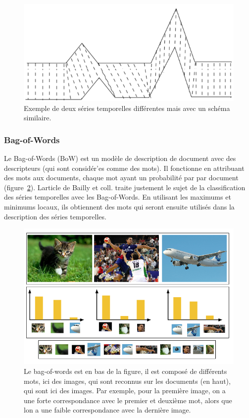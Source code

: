 \documentclass[11pt]{sdm}
\begin{document}
			\begin{figure}[!ht]
				\centering
				\includegraphics[scale=0.6,natwidth=582,natheight=269]{figures/dtw.png}
				\caption{Exemple de deux s\'eries temporelles diff\'erentes mais avec un sch\'ema similaire.}
				\label{fig:dtw}
			\end{figure}

		\subsubsection{Bag-of-Words}	
			Le Bag-of-Words (BoW) est un mod\`ele de description de document avec des descripteurs (qui sont consid\'er'es comme des mots). Il fonctionne en attribuant des mots aux documents, chaque mot ayant un probabilit\'e par par document (figure~\ref{fig:BoW}). L\textquotesingle article de Bailly et coll. \cite{bailly2015bag} traite justement le sujet de la classification des s\'eries temporelles avec les Bag-of-Words. En utilisant les maximums et minimums locaux, ils obtiennent des mots qui seront ensuite utilis\'es dans la description des s\'eries temporelles.

			\begin{figure}[!ht]
				\centering
				\includegraphics[scale=0.6,natwidth=680,natheight=440]{figures/bagOfWords.png}
				\caption{Le bag-of-words est en bas de la figure, il est compos\'e de diff\'erents mots, ici des images, qui sont reconnus sur les documents (en haut), qui sont ici des images. Par exemple, pour la premi\`ere image, on a une forte correspondance avec le premier et deuxi\`eme mot, alors que l\textquotesingle on a une faible correspondance avec la derni\`ere image.}
				\label{fig:BoW}
			\end{figure}
\end{document}
